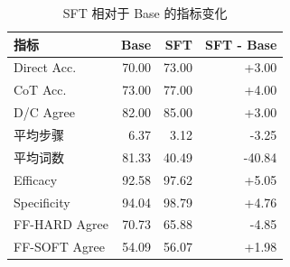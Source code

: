 \begin{table}[H]
\centering
\small
\caption{SFT 相对于 Base 的指标变化}
\label{tab:deltas}
\begin{tabular}{lrrr}
\toprule
指标 & Base & SFT & SFT - Base \\
\midrule
Direct Acc. & 70.00 & 73.00 & +3.00 \\
CoT Acc. & 73.00 & 77.00 & +4.00 \\
D/C Agree & 82.00 & 85.00 & +3.00 \\
平均步骤 & 6.37 & 3.12 & -3.25 \\
平均词数 & 81.33 & 40.49 & -40.84 \\
Efficacy & 92.58 & 97.62 & +5.05 \\
Specificity & 94.04 & 98.79 & +4.76 \\
FF-HARD Agree & 70.73 & 65.88 & -4.85 \\
FF-SOFT Agree & 54.09 & 56.07 & +1.98 \\
\bottomrule
\end{tabular}
\end{table}
